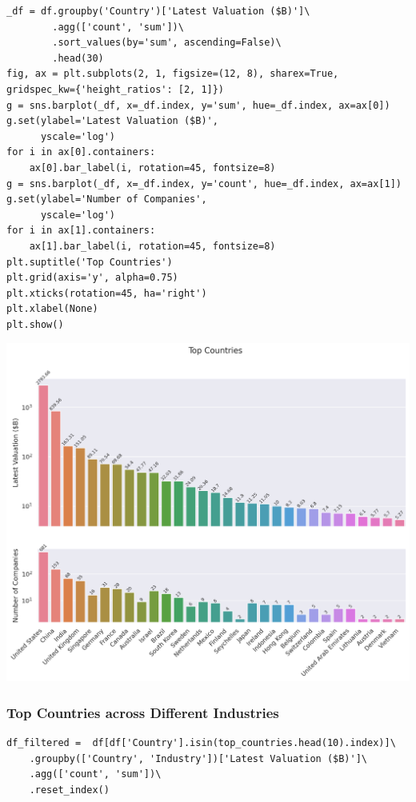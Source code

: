 \documentclass[a4paper,12pt]{article}
\begin{document}
\begin{verbatim}
_df = df.groupby('Country')['Latest Valuation ($B)']\
        .agg(['count', 'sum'])\
        .sort_values(by='sum', ascending=False)\
        .head(30)
fig, ax = plt.subplots(2, 1, figsize=(12, 8), sharex=True, gridspec_kw={'height_ratios': [2, 1]})
g = sns.barplot(_df, x=_df.index, y='sum', hue=_df.index, ax=ax[0])
g.set(ylabel='Latest Valuation ($B)',
      yscale='log')
for i in ax[0].containers:
    ax[0].bar_label(i, rotation=45, fontsize=8)
g = sns.barplot(_df, x=_df.index, y='count', hue=_df.index, ax=ax[1])
g.set(ylabel='Number of Companies',
      yscale='log')
for i in ax[1].containers:
    ax[1].bar_label(i, rotation=45, fontsize=8)
plt.suptitle('Top Countries')
plt.grid(axis='y', alpha=0.75)
plt.xticks(rotation=45, ha='right')
plt.xlabel(None)
plt.show()
\end{verbatim}

\begin{center}
\includegraphics[width=.9\linewidth]{./.ob-jupyter/5728821c163ecf170189f8e29f22ba792d629424.png}
\label{}
\end{center}
\subsubsection{Top Countries across Different Industries}
\label{sec:org462fdfe}

\begin{verbatim}
df_filtered =  df[df['Country'].isin(top_countries.head(10).index)]\
    .groupby(['Country', 'Industry'])['Latest Valuation ($B)']\
    .agg(['count', 'sum'])\
    .reset_index()
\end{verbatim}
\end{document}
